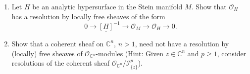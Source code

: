 \begin{enumerate}[label=\arabic*.]
\[L_i=\sum_{m=-N(i)}^{P(i)} a_m(z-x_i)^m,\quad0\leq P(i),N(i)<\infty.
\]
Show that there exists a meromorphic function $m$ on $M$ such that for all $i$, $(m-L_i)$ is holomorphic on some neighbourhood of $x_i$ and has a zero of order $P(i)+1$ at $z_i$ (see Exercise, \hyperref[sec:1:3]{\S3, Chapter 1}).
\item Let $H$ be an analytic hypersurface in the Stein manifold $M$. Show that $\mathcal O_H$ has a resolution by locally free sheaves of the form
\[
0\to\underline{[H]}^{-1}\to\mathcal O_M\to\mathcal O_H\to0.
\]
\item Show that a coherent sheaf on $\mathbb C^n$, $n>1$, need not have a resolution by (locally) free sheaves of $\mathcal O_{\mathbb C^n}$-modules (Hint: Given $z\in\mathbb C^n$ and $p\geq1$, consider resolutions of the coherent sheaf $\mathcal O_{\mathbb C^n}/\mathcal I_{\{z\}}^p$).
\end{enumerate}
